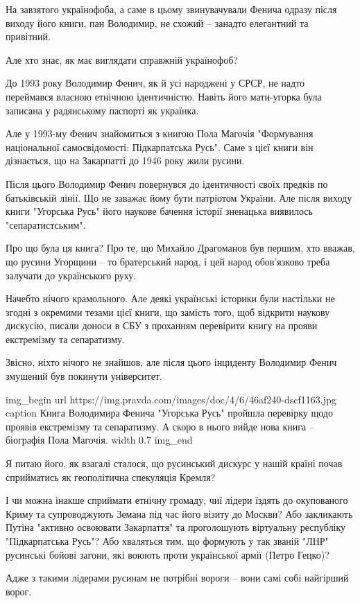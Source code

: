 На завзятого українофоба, а саме в цьому звинувачували Фенича одразу після
виходу його книги, пан Володимир, не схожий – занадто елегантний та привітний.

Але хто знає, як має виглядати справжній українофоб?

До 1993 року Володимир Фенич, як й усі народжені у СРСР, не надто переймався
власною етнічною ідентичністю. Навіть його мати-угорка була записана у
радянському паспорті як українка. 

Але у 1993-му Фенич знайомиться з книгою Пола Магочія "Формування національної
самосвідомості: Підкарпатська Русь". Саме з цієї книги він дізнається, що на
Закарпатті до 1946 року жили русини.

Після цього Володимир Фенич повернувся до ідентичності своїх предків по
батьківській лінії. Що не заважає йому бути патріотом України. Але після виходу
книги "Угорська Русь" його наукове бачення історії зненацька виявилось
"сепаратистським".

Про що була ця книга? Про те, що Михайло Драгоманов був першим, хто вважав, що
русини Угорщини – то братерський народ, і цей народ обов’язково треба залучати
до українського руху.

Начебто нічого крамольного. Але деякі українські історики були настільки не
згодні з окремими тезами цієї книги, що замість того, щоб відкрити наукову
дискусію, писали доноси в СБУ з проханням перевірити книгу на прояви
екстремізму та сепаратизму.

Звісно, ніхто нічого не знайшов, але після цього інциденту Володимир Фенич
змушений був покинути університет.

\ifcmt
img_begin 
	url https://img.pravda.com/images/doc/4/6/46af240-dscf1163.jpg
	caption Книга Володимира Фенича "Угорська Русь" пройшла перевірку щодо проявів екстремізму та сепаратизму. А скоро в нього вийде нова книга – біографія Пола Магочія.
    width 0.7
img_end
\fi

Я питаю його, як взагалі сталося, що русинський дискурс у нашій країні почав
сприйматись як геополітична спекуляція Кремля?

І чи можна інакше сприймати етнічну громаду, чиї лідери їздять до окупованого
Криму та супроводжують Земана під час його візиту до Москви? Або закликають
Путіна "активно освоювати Закарпаття" та проголошують віртуальну республіку
"Підкарпатська Русь"? Або хваляться тим, що формують у так званій "ЛНР"
русинські бойові загони, які воюють проти української армії (Петро Гецко)?

Адже з такими лідерами русинам не потрібні вороги – вони самі собі найгірший
ворог.

